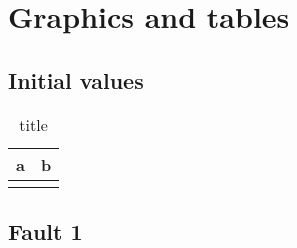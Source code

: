 
\appendixtoc
{}
\label{app:appendix}


%  
%
%


\chapter{Graphics and tables}

\section{Initial values}
\label{app:initials}

\begin{table}[H]
    \small
    \centering
    \caption[short]{title}
    \vspace{12pt}
    \begin{tabularx}{\textwidth}{|X|X|}
        \hline
        \rowcolor{lightgray} a & b \\ \hline \hline
        & \\ \hline
    \end{tabularx}
\end{table}

\section{Fault 1}
\label{app:fault1}

